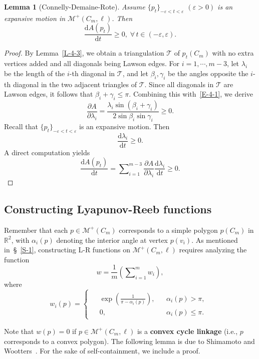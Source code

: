 \documentclass[11pt,letterpaper]{amsart}
\theoremstyle{plain}
\newtheorem{lemma}[theorem]{Lemma}
\theoremstyle{definition}
\theoremstyle{remark}
\numberwithin{equation}{section}
\begin{document}
\begin{lemma}[Connelly-Demaine-Rote]\label{L-4-9}
Assume $\{p_t\}_{-\varepsilon<t<\varepsilon}$ $(\varepsilon>0)$ is an expansive motion in $\mathcal M^{+}(C_m,\ell)$. Then
\[
\frac{\mathrm{d}A(p_t)}{\mathrm{d}t}\geq0,\;\forall\, t\in (-\varepsilon,\varepsilon).
\]
\end{lemma}
\begin{proof}
By Lemma~\ref{L-4-3}, we obtain a triangulation $\mathcal T$ of $p_t(C_m)$ with no extra vertices added and all diagonals being Lawson edges. For $i=1,\cdots,m-3$, let $\lambda_{i}$ be the length of the $i$-th diagonal in $\mathcal T$, and let $\beta_i, \gamma_i$ be the angles opposite the $i$-th diagonal in the two adjacent triangles of
$\mathcal T$. Since all diagonals in $\mathcal T$ are Lawson edges, it follows that
$\beta_i+\gamma_i\leq \pi$. Combining this with~\eqref{E-4-1}, we derive
\[
\frac{\partial A}{\partial \lambda_i}=\frac{\lambda_i\sin(\beta_i+\gamma_i)}{2\sin \beta_i\sin \gamma_i}\geq 0.
\]
Recall that $\{p_t\}_{-\varepsilon<t<\varepsilon}$ is an expansive motion. Then
\[
\frac{\mathrm{d}\lambda_i}{\mathrm{d}t}\geq 0.
\]
A direct computation yields
\[
\frac{\mathrm{d}A(p_t)}{\mathrm{d}t}=\sum\nolimits_{i=1}^{m-3}\frac{\partial A}{\partial \lambda_i}\frac{\mathrm{d}\lambda_i}{\mathrm{d}t}\geq 0.
\]
\end{proof}

\subsection{Constructing Lyapunov-Reeb functions} Remember that each $p\in \mathcal M^{+}(C_m)$ corresponds to a simple polygon $p(C_m)$ in $\mathbb R^2$, with $\alpha_i(p)$ denoting the interior angle at vertex $p(v_i)$. As mentioned in~\S~\ref{S-1},  constructing L-R functions on $\mathcal M^{+}(C_m,\ell)$ requires analyzing the function
\[
w=\frac{1}{m}\left(\sum\nolimits_{i=1}^m w_i\right),
\]
where
\[
w_i(p)=
\begin{cases}
\begin{aligned}
&\exp\left(\frac{1}{\pi-\alpha_i(p)}\right), &&\alpha_i(p)>\pi,\\
&0, &&\alpha_i(p)\leq\pi.
\end{aligned}
\end{cases}
\]

Note that $w(p)=0$ if $p\in \mathcal M^{+}(C_m,\ell)$ is a \textbf{convex cycle linkage} (i.e., $p$ corresponds to a convex polygon). The following lemma is due to Shimamoto and Wootters~\cite{Shimamoto-2014}. For the sake of self-containment, we include a proof.
\end{document}
